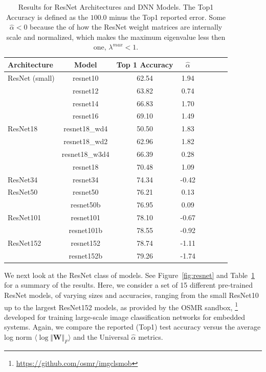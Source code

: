 \begin{table}[t] %
\small
\begin{center}
\begin{tabular}{|p{0.75in}|c|c|c|c|c|c|c|}
\hline
Architecture 
 & Model
 & Top 1 Accuracy & $\hat{\alpha}$ \\
\hline
ResNet (small)   & resnet10 & 62.54 & 1.94 \\
 & resnet12 & 63.82 & 0.74 \\
 & resnet14 & 66.83 & 1.70 \\
 & resnet16 & 69.10 & 1.49 \\
 \hline
 ResNet18  & resnet18\_wd4 & 50.50 & 1.83 \\
 & resnet18\_wd2 & 62.96 & 1.82 \\
 & resnet18\_w3d4 & 66.39 & 0.28 \\
 & resnet18 & 70.48 & 1.09 \\
 \hline
ResNet34 & resnet34 & 74.34 & -0.42 \\
\hline
ResNet50  & resnet50 & 76.21 & 0.13 \\
 & resnet50b & 76.95 & 0.09 \\
 \hline
ResNet101 & resnet101 & 78.10 & -0.67 \\
 & resnet101b & 78.55 & -0.92 \\
\hline
ResNet152 & resnet152 & 78.74 & -1.11 \\
 & resnet152b & 79.26 & -1.74 \\
\hline
\end{tabular}
\end{center}
\caption{Results for ResNet Architectures and DNN Models.  The Top1 Accuracy is defined
as the $100.0$ minus the Top1 reported error.  Some $\hat{\alpha}<0$ because the of how
the ResNet weight matrices are internally scale and normalized, which makes the maximum eigenvalue
less then one, $\lambda^{max}<1$.
        }
\label{table:models_resnet}
\end{table}


\vspace{-1mm}

We next look at the ResNet class of models. 
See Figure~\ref{fig:resnet} and Table~\ref{table:models_resnet} for a summary of the results.
Here, we consider a set of 15 different pre-trained ResNet models, of varying sizes and accuracies, ranging from the small ResNet10 up to the largest ResNet152 models, as provided by the OSMR sandbox,%
\footnote{\url{https://github.com/osmr/imgclsmob}}
developed for training large-scale image classification networks for embedded systems.
Again, we compare the reported (Top1) test accuracy versus the average log norm $\langle\log\Vert\mathbf{W}\Vert_{F}\rangle$ and the Universal $\hat{\alpha}$ metrics. 

